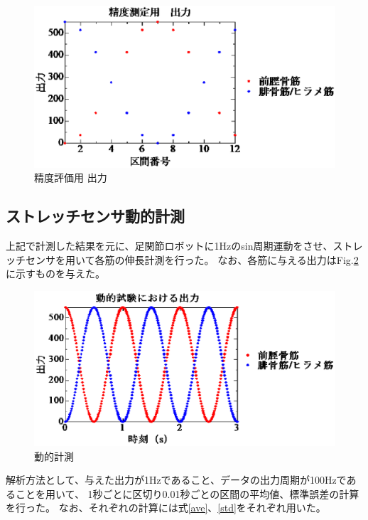 \begin{figure}[h]
    \begin{center}
        \includegraphics[width=0.76\columnwidth,clip]{2_measurement/output/output.eps}
        \caption{精度評価用 出力}
        \label{output_for_test}
    \end{center}
\end{figure}

\newpage

\subsection{ストレッチセンサ動的計測}
上記で計測した結果を元に、足関節ロボットに1Hzのsin周期運動をさせ、ストレッチセンサを用いて各筋の伸長計測を行った。
なお、各筋に与える出力はFig.\ref{output_for_actions}に示すものを与えた。

\begin{figure}[h]
  \includegraphics[width=0.76\columnwidth,clip]{3_analysis/outPut/putPut.eps}
  \caption{動的計測}
  \label{output_for_actions}
\end{figure}

解析方法として、与えた出力が1Hzであること、データの出力周期が100Hzであることを用いて、
1秒ごとに区切り0.01秒ごとの区間の平均値、標準誤差の計算を行った。
なお、それぞれの計算には式\ref{ave}、\ref{std}をそれぞれ用いた。
